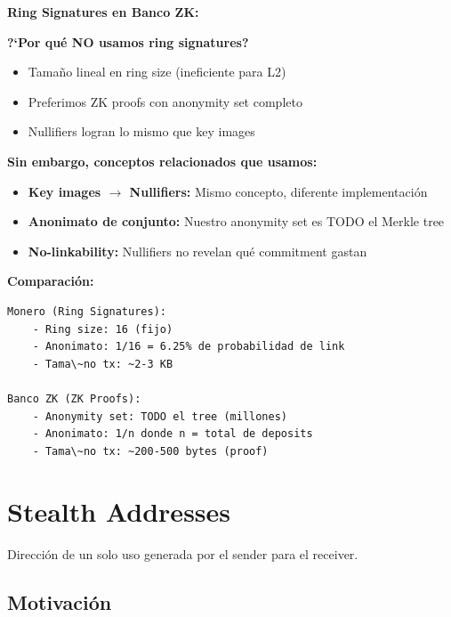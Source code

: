 \documentclass[11pt,a4paper,twoside]{book}
\begin{document}
\begin{bancozk}
\textbf{Ring Signatures en Banco ZK:}

\textbf{?`Por qu\'e NO usamos ring signatures?}

\begin{itemize}
    \item Tama\~no lineal en ring size (ineficiente para L2)
    \item Preferimos ZK proofs con anonymity set completo
    \item Nullifiers logran lo mismo que key images
\end{itemize}

\textbf{Sin embargo, conceptos relacionados que usamos:}

\begin{itemize}
    \item \textbf{Key images $\to$ Nullifiers:} Mismo concepto, diferente implementaci\'on
    \item \textbf{Anonimato de conjunto:} Nuestro anonymity set es TODO el Merkle tree
    \item \textbf{No-linkability:} Nullifiers no revelan qu\'e commitment gastan
\end{itemize}

\textbf{Comparaci\'on:}
\begin{verbatim}
Monero (Ring Signatures):
    - Ring size: 16 (fijo)
    - Anonimato: 1/16 = 6.25% de probabilidad de link
    - Tama\~no tx: ~2-3 KB

Banco ZK (ZK Proofs):
    - Anonymity set: TODO el tree (millones)
    - Anonimato: 1/n donde n = total de deposits
    - Tama\~no tx: ~200-500 bytes (proof)
\end{verbatim}
\end{bancozk}

\section{Stealth Addresses}
\label{sec:stealth-addresses}

\begin{definition}
Direcci\'on de un solo uso generada por el sender para el receiver.
\end{definition}

\subsection{Motivaci\'on}
\end{document}

